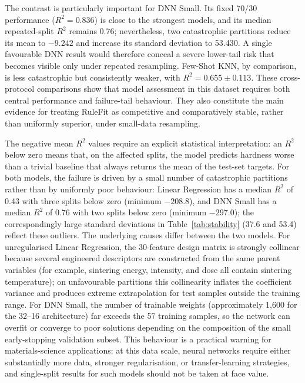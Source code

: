 \documentclass[pdflatex,sn-mathphys-num]{sn-jnl}%
\theoremstyle{thmstyleone}%
\theoremstyle{thmstyletwo}%
\theoremstyle{thmstylethree}%
\begin{document}
The contrast is particularly important for DNN Small. Its fixed 70/30 performance ($R^2=0.836$) is close to the strongest models, and its median repeated-split $R^2$ remains 0.76; nevertheless, two catastrophic partitions reduce its mean to $-9.242$ and increase its standard deviation to 53.430. A single favourable DNN result would therefore conceal a severe lower-tail risk that becomes visible only under repeated resampling. Few-Shot KNN, by comparison, is less catastrophic but consistently weaker, with $R^2=0.655 \pm 0.113$. These cross-protocol comparisons show that model assessment in this dataset requires both central performance and failure-tail behaviour. They also constitute the main evidence for treating RuleFit as competitive and comparatively stable, rather than uniformly superior, under small-data resampling.

The negative mean $R^2$ values require an explicit statistical interpretation: an $R^2$ below zero means that, on the affected splits, the model predicts hardness worse than a trivial baseline that always returns the mean of the test-set targets. For both models, the failure is driven by a small number of catastrophic partitions rather than by uniformly poor behaviour: Linear Regression has a median $R^2$ of 0.43 with three splits below zero (minimum $-208.8$), and DNN Small has a median $R^2$ of 0.76 with two splits below zero (minimum $-297.0$); the correspondingly large standard deviations in Table~\ref{tab:stability} (37.6 and 53.4) reflect these outliers. The underlying causes differ between the two models. For unregularised Linear Regression, the 30-feature design matrix is strongly collinear because several engineered descriptors are constructed from the same parent variables (for example, sintering energy, intensity, and dose all contain sintering temperature); on unfavourable partitions this collinearity inflates the coefficient variance and produces extreme extrapolation for test samples outside the training range. For DNN Small, the number of trainable weights (approximately 1{,}600 for the 32--16 architecture) far exceeds the 57 training samples, so the network can overfit or converge to poor solutions depending on the composition of the small early-stopping validation subset. This behaviour is a practical warning for materials-science applications: at this data scale, neural networks require either substantially more data, stronger regularisation, or transfer-learning strategies, and single-split results for such models should not be taken at face value.
\end{document}
